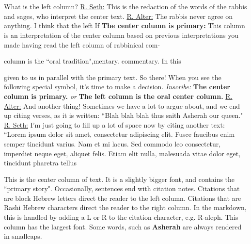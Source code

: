 \documentclass[11pt,letterpaper,openany]{scrbook}
\newcommand{\chfont}[1]{\centerfont{\huge\textcolor{hcolor}{#1}}}
\newcommand{\leftcitation}[1]{\leftcitationfont{\Large\textcolor{hcolor}{#1}}}
\newcommand{\rightcitation}[1]{\rightcitationfont{\normalsize\textcolor{hcolor}{#1}}}
\begin{document}
\begin{sloppypar}

\chapter*{\chfont{The Hammer of Lilith}}

\begin{paracol}{2}

\fontsize{11}{13}\leftfont \leftcitation{א} \leftfont What is the left column? \underline{R. Seth:} This is the redaction of the words of the rabbis and sages, who interpret the center text. \underline{R. Alter:} The rabbis never agree on anything. I think that the left\switchcolumn\fontsize{11}{13}\rightfont \rightcitation{א} \rightfont If \textbf{The center column is primary:}  This column is an interpretation of the center column based on previous interpretations you made having read the left column of rabbinical com-

\end{paracol}


\begin{paracol}{3}

\fontsize{11}{13}\leftfont column is the ``oral tradition",\switchcolumn[2]\fontsize{11}{13}\rightfont mentary. commentary. In this

\end{paracol}

\begin{paracol}{3}\fontsize{11}{13}\leftfont given to us in parallel with the primary text. So there! When you see the following special symbol, it's time to make a decision.  \leftfont \textit{Inscribe:} \textbf{The center column is primary.} \textit{or} \textbf{The left column is the oral center column.} \leftcitation{ב} \leftfont \underline{R. Alter:}  And another thing! Sometimes we have a lot to argue about, and we end up citing verses, as it is written: ``Blah blah blah thus saith Asherah our queen." \underline{R. Seth:} I'm just going to fill up a lot of space now by citing another text: ``Lorem ipsum dolor sit amet, consectetur adipiscing elit. Fusce faucibus enim semper tincidunt varius. Nam et mi lacus. Sed commodo leo consectetur, imperdiet neque eget, aliquet felis. Etiam elit nulla, malesuada vitae dolor eget, tincidunt pharetra tellus

\switchcolumn

\fontsize{13}{15}\centerfont This is the center column of text. It is a slightly bigger font, and contains the ``primary story". Occasionally, sentences end with citation notes. \leftcitationfont{\leftcitation א} \centerfont  Citations that are block Hebrew letters direct the reader to the left column. \leftcitationfont{\leftcitation ב} \centerfont  Citations that are Rashi Hebrew characters direct the reader to the right column. \rightcitationfont{\rightcitation א} \centerfont In the markdown, this is handled by adding a L or R to the citation character, e.g. R-aleph. \rightcitationfont{\rightcitation ב} \centerfont  This column has the largest font. Some words, such as \textbf{Asherah} are always rendered in smallcaps.


\end{paracol}
\end{sloppypar}
\end{document}
